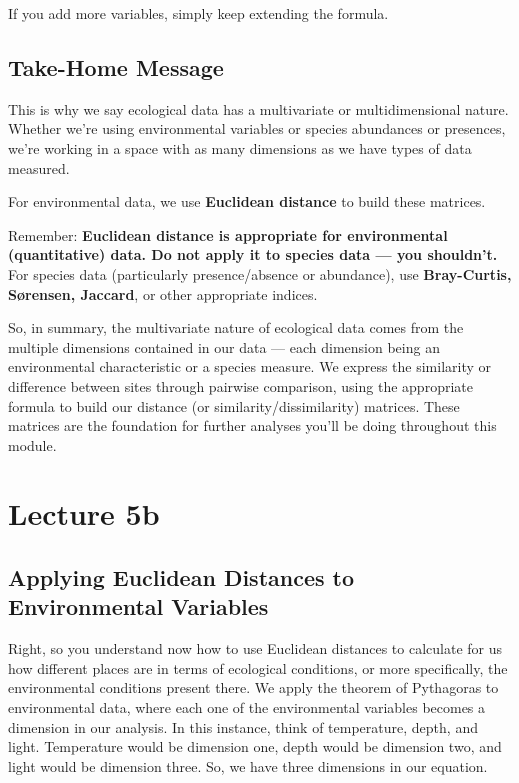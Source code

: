 \documentclass[
  10pt,
]{book}
\begin{document}
If you add more variables, simply keep extending the formula.

\section{Take-Home Message}\label{take-home-message}

This is why we say ecological data has a multivariate or
multidimensional nature. Whether we're using environmental variables or
species abundances or presences, we're working in a space with as many
dimensions as we have types of data measured.

For environmental data, we use \textbf{Euclidean distance} to build
these matrices.

Remember: \textbf{Euclidean distance is appropriate for environmental
(quantitative) data. Do not apply it to species data --- you shouldn't.}
For species data (particularly presence/absence or abundance), use
\textbf{Bray-Curtis, Sørensen, Jaccard}, or other appropriate indices.

So, in summary, the multivariate nature of ecological data comes from
the multiple dimensions contained in our data --- each dimension being
an environmental characteristic or a species measure. We express the
similarity or difference between sites through pairwise comparison,
using the appropriate formula to build our distance (or
similarity/dissimilarity) matrices. These matrices are the foundation
for further analyses you'll be doing throughout this module.

\chapter*{Lecture 5b}\label{lecture-5b}

\section{Applying Euclidean Distances to Environmental
Variables}\label{applying-euclidean-distances-to-environmental-variables}

Right, so you understand now how to use Euclidean distances to calculate
for us how different places are in terms of ecological conditions, or
more specifically, the environmental conditions present there. We apply
the theorem of Pythagoras to environmental data, where each one of the
environmental variables becomes a dimension in our analysis. In this
instance, think of temperature, depth, and light. Temperature would be
dimension one, depth would be dimension two, and light would be
dimension three. So, we have three dimensions in our equation.
\end{document}

